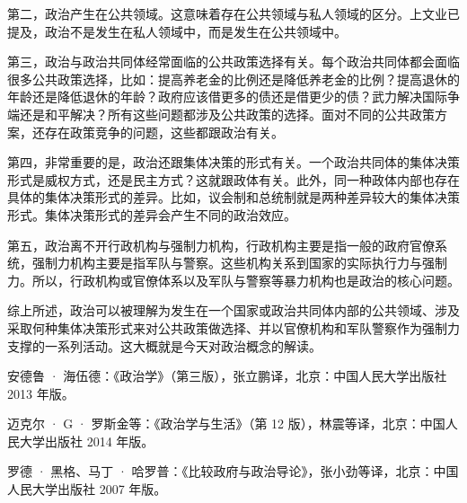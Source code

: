 第二，政治产生在公共领域。这意味着存在公共领域与私人领域的区分。上文业已提及，政治不是发生在私人领域中，而是发生在公共领域中。

第三，政治与政治共同体经常面临的公共政策选择有关。每个政治共同体都会面临很多公共政策选择，比如：提高养老金的比例还是降低养老金的比例？提高退休的年龄还是降低退休的年龄？政府应该借更多的债还是借更少的债？武力解决国际争端还是和平解决？所有这些问题都涉及公共政策的选择。面对不同的公共政策方案，还存在政策竞争的问题，这些都跟政治有关。

第四，非常重要的是，政治还跟集体决策的形式有关。一个政治共同体的集体决策形式是威权方式，还是民主方式？这就跟政体有关。此外，同一种政体内部也存在具体的集体决策形式的差异。比如，议会制和总统制就是两种差异较大的集体决策形式。集体决策形式的差异会产生不同的政治效应。

第五，政治离不开行政机构与强制力机构，行政机构主要是指一般的政府官僚系统，强制力机构主要是指军队与警察。这些机构关系到国家的实际执行力与强制力。所以，行政机构或官僚体系以及军队与警察等暴力机构也是政治的核心问题。

综上所述，政治可以被理解为发生在一个国家或政治共同体内部的公共领域、涉及采取何种集体决策形式来对公共政策做选择、并以官僚机构和军队警察作为强制力支撑的一系列活动。这大概就是今天对政治概念的解读。


安德鲁 · 海伍德：《政治学》（第三版），张立鹏译，北京：中国人民大学出版社 2013 年版。

迈克尔 · G · 罗斯金等：《政治学与生活》（第 12 版），林震等译，北京：中国人民大学出版社 2014 年版。

罗德 · 黑格、马丁 · 哈罗普：《比较政府与政治导论》，张小劲等译，北京：中国人民大学出版社 2007 年版。
